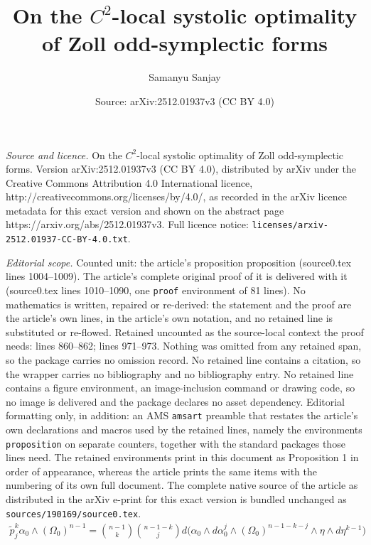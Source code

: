 \documentclass[10pt,a4paper]{amsart}
\title{On the $C^2$-local systolic optimality of Zoll odd-symplectic forms}
\author{Samanyu Sanjay}
\date{Source: arXiv:2512.01937v3 (CC BY 4.0)}
\begin{document}
\maketitle

\noindent\emph{Source and licence.} On the $C^2$-local systolic optimality of Zoll odd-symplectic forms. Version arXiv:2512.01937v3 (CC BY 4.0), distributed by arXiv under the Creative Commons Attribution 4.0 International licence, http://creativecommons.org/licenses/by/4.0/, as recorded in the arXiv licence metadata for this exact version and shown on the abstract page https://arxiv.org/abs/2512.01937v3. Full licence notice: \texttt{licenses/arxiv-2512.01937-CC-BY-4.0.txt}.\par\smallskip

\noindent\textit{Editorial scope.} Counted unit: the article's proposition proposition (source0.tex lines 1004--1009). The article's complete original proof of it is delivered with it (source0.tex lines 1010--1090, one \texttt{proof} environment of 81 lines). No mathematics is written, repaired or re-derived: the statement and the proof are the article's own lines, in the article's own notation, and no retained line is substituted or re-flowed.  Retained uncounted as the source-local context the proof needs: lines 860--862; lines 971--973.  Nothing was omitted from any retained span, so the package carries no omission record.  No retained line contains a citation, so the wrapper carries no bibliography and no bibliography entry.  No retained line contains a figure environment, an image-inclusion command or drawing code, so no image is delivered and the package declares no asset dependency.  Editorial formatting only, in addition: an AMS \texttt{amsart} preamble that restates the article's own declarations and macros used by the retained lines, namely the environments \texttt{proposition} on separate counters, together with the standard packages those lines need.  The retained environments print in this document as Proposition 1 in order of appearance, whereas the article prints the same items with the numbering of its own full document.  The complete native source of the article as distributed in the arXiv e-print for this exact version is bundled unchanged as \texttt{sources/190169/source0.tex}.
\begin{align}\label{def_of_p_tilde}
    \tilde{p}^k_j \alpha_0 \wedge (\Omega_0)^{n-1} = \binom{n-1}{k} \binom{n-1-k}{j} d\big(\alpha_0 \wedge d\alpha^j_0 \wedge (\Omega_0)^{n-1-k-j}\wedge \eta \wedge d\eta^{k-1}\big)
\end{align}
\end{document}
